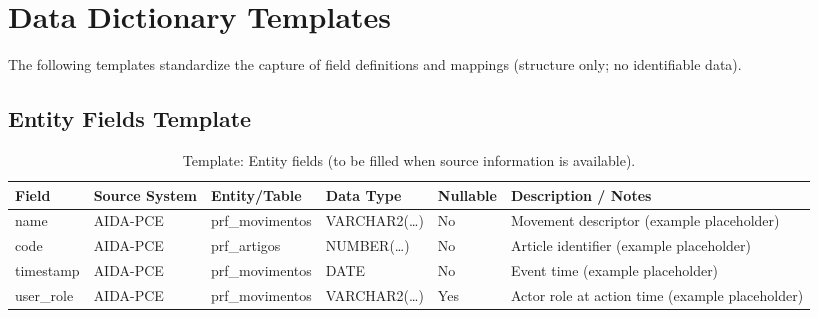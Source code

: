 \section{Data Dictionary Templates}
The following templates standardize the capture of field definitions and mappings (structure only; no identifiable data).

\subsection{Entity Fields Template}
\begin{table}[H]
    \centering
    \caption{Template: Entity fields (to be filled when source information is available).}
    \label{tab:template_entity_fields}
    {\setlength{\tabcolsep}{4pt}\small
    \begin{tabularx}{\textwidth}{@{}>{\raggedright\arraybackslash}p{2.7cm} >{\raggedright\arraybackslash}p{2.3cm} >{\raggedright\arraybackslash}p{2.7cm} >{\raggedright\arraybackslash}p{2.2cm} >{\centering\arraybackslash}p{1.6cm} >{\raggedright\arraybackslash}X@{}}
        \toprule
        \textbf{Field} & \textbf{Source System} & \textbf{Entity/Table} & \textbf{Data Type} & \textbf{Nullable} & \textbf{Description / Notes} \\
        \midrule
        name & AIDA-PCE & prf\_movimentos & VARCHAR2(\ldots) & No & Movement descriptor (example placeholder) \\
        code & AIDA-PCE & prf\_artigos & NUMBER(\ldots) & No & Article identifier (example placeholder) \\
        timestamp & AIDA-PCE & prf\_movimentos & DATE & No & Event time (example placeholder) \\
        user\_role & AIDA-PCE & prf\_movimentos & VARCHAR2(\ldots) & Yes & Actor role at action time (example placeholder) \\
        \bottomrule
    \end{tabularx}}
\end{table}

